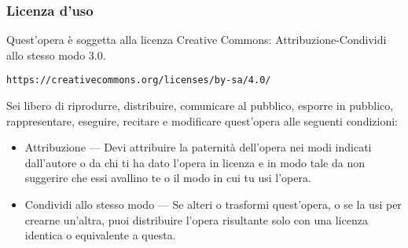 
\begin{frame}[containsverbatim]\frametitle{Licenza d'uso}
  \small

  Quest'opera {\`e} soggetta alla licenza Creative Commons:
Attribuzione-Condividi
  allo stesso modo 3.0.

  \verb+https://creativecommons.org/licenses/by-sa/4.0/+

  Sei libero di riprodurre, distribuire, comunicare al pubblico, esporre
in
  pubblico, rappresentare, eseguire, recitare e modificare quest'opera
  alle seguenti condizioni:
  \begin{itemize}
  \item
    Attribuzione — Devi attribuire la paternit{\`a} dell'opera nei modi
indicati
    dall'autore o da chi ti ha dato l'opera in licenza e in modo tale da
non
    suggerire che essi avallino te o il modo in cui tu usi l'opera.
  \item
    Condividi allo stesso modo — Se alteri o trasformi quest'opera, o se
la usi
    per crearne un'altra, puoi distribuire l'opera risultante solo con
una licenza
    identica o equivalente a  questa.
  \end{itemize}
  \vspace*{1cm}
\end{frame}


